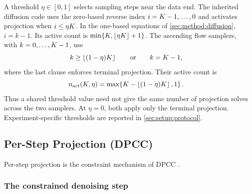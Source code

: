 A threshold $\eta\in[0,1]$ selects sampling steps near the data end. The inherited diffusion code
uses the zero-based reverse index $i=K-1,\ldots,0$ and activates projection when
$i\le\eta K$. In the one-based equations of \autoref{sec:method:diffusion}, $i=k-1$.
Its active count is $\min\{K,\lfloor\eta K\rfloor+1\}$.
The ascending flow samplers, with $k=0,\ldots,K-1$, use
\begin{equation}\label{eq:method:proj:gate}
  k\ge\left\lfloor(1-\eta)K\right\rfloor
  \qquad\text{or}\qquad k=K-1,
\end{equation}
where the last clause enforces terminal projection. Their active count is
\begin{equation}\label{eq:method:proj:nact}
  n_{\textrm{act}}(K,\eta)
  =\max\!\left\{K-\left\lfloor(1-\eta)K\right\rfloor,1\right\}.
\end{equation}
Thus a shared threshold value need not give the same number of projection solves across the two
samplers. At $\eta=0$, both apply only the terminal projection. Experiment-specific thresholds are
reported in \autoref{sec:setup:protocol}.

\subsection{Per-Step Projection (DPCC)}\label{sec:method:dpcc}

Per-step projection is the constraint mechanism of \ac{DPCC} \parencite{romer2025diffusion}.

\subsubsection*{The constrained denoising step}

